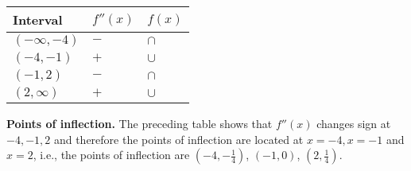 {\begin{tabular}{|lll|}\hline
Interval & $f''(x)$ & $f(x)$   \\\hline
$(-\infty, -4)$ & $-$& $\cap$ \\\hline
$(-4, -1)$ &$+$&$\cup$\\\hline
$(-1, 2)$&$-$&$\cap$ \\\hline
$(2, \infty)$&$+$&$\cup$ \\\hline
\end{tabular}

\textbf{Points of inflection.} The preceding table shows that $f''(x)$ changes sign at $-4, -1, 2$ and therefore the points of inflection are located at $x=-4, x=-1$ and $x=2$, i.e., the points of inflection are $\left(-4, -\frac{1}{4}\right)$, $\left(-1, 0\right)$, $\left(2, \frac{1}{4}\right)$.

}